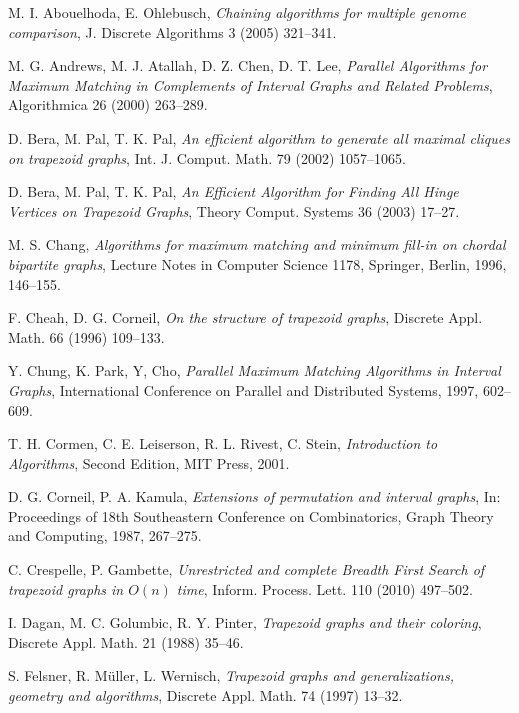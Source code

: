 \documentclass[11pt,letter]{article}
\begin{document}
\begin{thebibliography}{99}

    M. I. Abouelhoda, E. Ohlebusch,
    \emph{Chaining algorithms for multiple genome comparison},
    J. Discrete Algorithms 3 (2005) 321--341.

    M. G. Andrews, M. J. Atallah, D. Z. Chen, D. T. Lee,
    \emph{Parallel Algorithms for Maximum Matching in Complements of Interval Graphs and Related
    Problems}, Algorithmica 26 (2000) 263--289.

    D. Bera, M. Pal, T. K. Pal,
    \emph{An efficient algorithm to generate all maximal cliques on trapezoid graphs},
    Int. J. Comput. Math. 79 (2002) 1057--1065.

    D. Bera, M. Pal, T. K. Pal,
    \emph{An Efficient Algorithm for Finding All Hinge Vertices on Trapezoid Graphs},
    Theory Comput. Systems 36 (2003) 17--27.

    M. S. Chang,
    \emph{Algorithms for maximum matching and minimum fill-in on chordal bipartite graphs},
    Lecture Notes in Computer Science 1178, Springer, Berlin, 1996, 146--155.

    F. Cheah, D. G. Corneil,
    \emph{On the structure of trapezoid graphs},
    Discrete Appl. Math. 66 (1996) 109--133.

    Y. Chung, K. Park, Y, Cho,
    \emph{Parallel Maximum Matching Algorithms in Interval Graphs},
    International Conference on Parallel and Distributed Systems, 1997, 602--609.

    T. H. Cormen, C. E. Leiserson, R. L. Rivest, C. Stein,
    \emph{Introduction to Algorithms},
    Second Edition, MIT Press, 2001.

    D. G. Corneil, P. A. Kamula,
    \emph{Extensions of permutation and interval graphs},
    In: Proceedings of 18th Southeastern Conference on Combinatorics, Graph Theory and Computing, 1987, 267--275.

    C. Crespelle, P. Gambette,
    \emph{Unrestricted and complete Breadth First Search of trapezoid graphs in $O(n)$ time},
    Inform. Process. Lett. 110 (2010) 497--502.

    I. Dagan, M. C. Golumbic, R. Y. Pinter,
    \emph{Trapezoid graphs and their coloring},
    Discrete Appl. Math. 21 (1988) 35--46.

    S. Felsner, R. M\" uller, L. Wernisch,
    \emph{Trapezoid graphs and generalizations, geometry and algorithms},
    Discrete Appl. Math. 74 (1997) 13--32.


\end{thebibliography}
\end{document}
